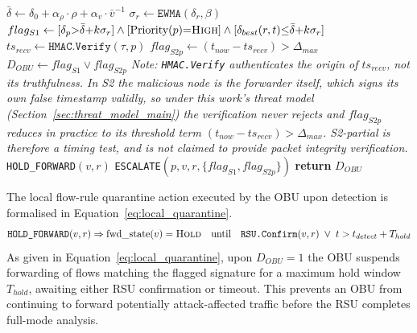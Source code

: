 \documentclass[12pt, a4paper]{report}
\begin{document}
\begin{algorithm}[H]
\caption{\ac{OBU} Lightweight Rule-Based Detection
(\texttt{LRAD-OBU})}
\begin{algorithmic}[1]
\small
{}
  \State $\bar{\delta} \gets \delta_0
         +\alpha_\rho\cdot\rho
         +\alpha_v\cdot\bar{v}^{-1}$
         \hfill{}
  \State $\sigma_r \gets \texttt{EWMA}(\delta_r,\beta)$
         \hfill{}
  \State $flag_{S1} \gets
         [\delta_p{>}\bar{\delta}{+}k\sigma_r]
         \land[\text{Priority}(p){=}\textsc{High}]
         \land[\delta_{best}(r,t){\leq}
         \bar{\delta}{+}k\sigma_r]$
         \hfill{}
  \State $ts_{recv} \gets \texttt{HMAC.Verify}(\tau,p)$
         \hfill{}
  \State $flag_{S2p} \gets
         (t_{now}-ts_{recv})>\Delta_{max}$
         \hfill{}
  \State $D_{OBU} \gets flag_{S1}\lor flag_{S2p}$
         \hfill{}
  \Statex \textit{Note: \texttt{HMAC.Verify} authenticates the
         \emph{origin} of $ts_{recv}$, not its truthfulness. In S2
         the malicious node is the forwarder itself, which signs its
         own false timestamp validly, so under this work's threat
         model (Section~\ref{sec:threat_model_main}) the verification
         never rejects and $flag_{S2p}$ reduces in practice to its
         threshold term $(t_{now}-ts_{recv})>\Delta_{max}$.
         S2-partial is therefore a timing test, and is not claimed
         to provide packet integrity verification.}
    \State \texttt{HOLD\_FORWARD}$(v,r)$
           \hfill{}
    \State \texttt{ESCALATE}$(p,v,r,
           \{flag_{S1},flag_{S2p}\})$
           \hfill{}
  \EndIf
  \State \textbf{return} $D_{OBU}$
\EndProcedure
\end{algorithmic}
\label{alg:lrad_obu}
\end{algorithm}

The local flow-rule quarantine action executed by the
\ac{OBU} upon detection is formalised in
Equation~\eqref{eq:local_quarantine}.
\begin{equation}
\texttt{HOLD\_FORWARD}(v,r) \Rightarrow
\text{fwd\_state}(v) = \textsc{Hold}
\quad\text{until}\quad
\texttt{RSU.Confirm}(v,r)\;\lor\;
t > t_{detect} + T_{hold}
\label{eq:local_quarantine}
\end{equation}
As given in Equation~\eqref{eq:local_quarantine},
upon $D_{OBU}{=}1$ the \ac{OBU} suspends forwarding
of flows matching the flagged signature for a maximum
hold window $T_{hold}$, awaiting either \ac{RSU}
confirmation or timeout. This prevents an \ac{OBU}
from continuing to forward potentially attack-affected
traffic before the \ac{RSU} completes full-mode
analysis.
\end{document}
